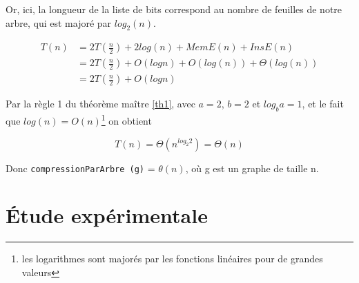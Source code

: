 \documentclass[12pt,a4paper]{article}
\begin{document}
Or, ici, la longueur de la liste de bits correspond au nombre de feuilles de notre arbre, qui est majoré par $log_2 (n)$.

\begin{align*}
T(n) &= 2 T(\frac{n}{2}) + 2log(n) + MemE(n) + InsE(n)\\
&= 2 T(\frac{n}{2}) + O(log n) + O(log(n)) + \Theta (log(n))\\
&= 2 T(\frac{n}{2}) + O(log n)
\end{align*}

Par la règle 1 du théorème maître  \ref{th1}, avec $a = 2$, $b = 2$ et $log_b a = 1$, et le fait que $log(n) = O(n)$\footnote{les logarithmes sont majorés par les fonctions linéaires pour de grandes valeurs} on obtient 

$$
T(n) = \Theta (n ^{log_2 2}) = \Theta(n)
$$ 

\medskip

Donc \texttt{compressionParArbre (g)} = $\theta(n)$, où g est un graphe de taille n.






\section{Étude expérimentale}
\end{document}
